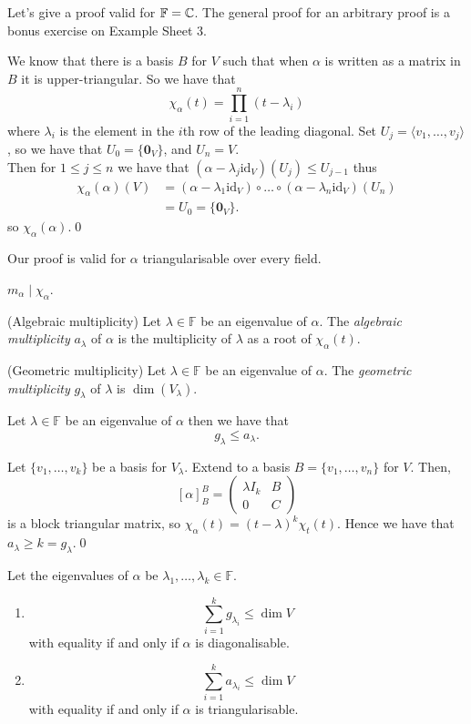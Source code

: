 \documentclass{article}
\newcommand{\F}{\mathbb{F}}
\renewcommand{\id}{\mathrm{id}}
\begin{document}
Let's give a proof valid for $ \F=\C $. The general proof for an arbitrary proof is a bonus exercise on Example Sheet 3.\par
\pf We know that there is a basis $ B $ for $ V $ such that when $ \alpha $ is written as a matrix in $ B $ it is upper-triangular. So we have that
\[
	\chi_\alpha(t)=\prod_{i=1}^n(t-\lambda_i)
\]
where $ \lambda_i $ is the element in the $ i $th row of the leading diagonal. Set $ U_j=\langle v_1,\dots, v_j\rangle $, so we have that $ U_0=\{\mathbf 0_V\} $, and $ U_n=V $.\\
Then for $ 1\le j\le n $ we have that $ (\alpha-\lambda_j\id_V)(U_j)\le U_{j-1} $ thus
\begin{align*}
	\chi_\alpha(\alpha)(V)&=(\alpha-\lambda_1\id_V)\circ \dots \circ (\alpha-\lambda_n\id_V)(U_n)\\&
	=U_0=\{\mathbf 0_V\}.
\end{align*}
so $ \chi_\alpha(\alpha) $.\qed
\par
Our proof is valid for $ \alpha $ triangularisable over every field.
\begin{corollary}
  $ m_\alpha\mid \chi_\alpha $.
\end{corollary}
\begin{definition}
	(Algebraic multiplicity) Let $ \lambda\in \F $ be an eigenvalue of $ \alpha $. The \textit{algebraic multiplicity} $ a_\lambda $ of $ \alpha $ is the multiplicity of $ \lambda $ as a root of $ \chi_\alpha(t) $.
\end{definition}
\begin{definition}
	(Geometric multiplicity) Let $ \lambda\in \F $ be an eigenvalue of $ \alpha $. The \textit{geometric multiplicity} $ g_\lambda $ of $ \lambda $ is $ \dim(V_\lambda) $.
\end{definition}
\begin{proposition}
	Let $ \lambda\in\F $ be an eigenvalue of $ \alpha $ then we have that 
	\[
	  g_\lambda\le a_\lambda.
	\]
\end{proposition}
\pf Let $ \{v_1,\dots, v_k\} $ be a basis for $ V_\lambda $. Extend to a basis $ B=\{v_1,\dots, v_n\} $ for $ V $. Then,
\[
	[\alpha]_B^B=\begin{pmatrix}
		\lambda I_k & B \\
		0 & C
	\end{pmatrix}
\]
is a block triangular matrix, so $ \chi_\alpha(t)=(t-\lambda)^k\chi_t(t) $. Hence we have that $ a_\lambda \ge k=g_\lambda $.\qed
\begin{lemma}
  Let the eigenvalues of $ \alpha $ be $ \lambda_1,\dots, \lambda_k\in \F $.
  \begin{enumerate}
	  \item \[
			  \sum_{i=1}^k g_{\lambda_i}\le \dim V
	  \]
	  with equality if and only if $ \alpha $ is diagonalisable.
  \item
	  \[
		  \sum_{i=1}^ka_{\lambda_i}\le \dim V
	  \]
	  with equality if and only if $ \alpha $ is triangularisable.
  \end{enumerate}
\end{lemma}
\end{document}
